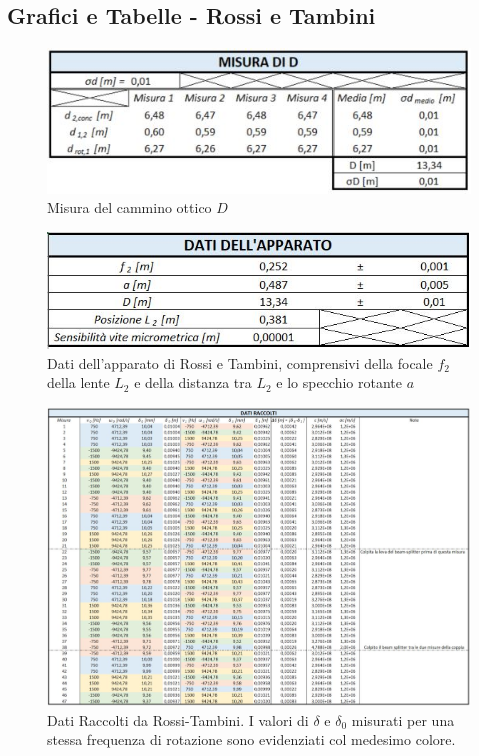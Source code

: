 \documentclass{article}
\begin{document}
\subsection{Grafici e Tabelle - Rossi e Tambini} \label{RT}

\begin{figure}[h]
    \centering
    \includegraphics[width=0.5\linewidth]{RT_D.JPG}
    \caption{Misura del cammino ottico $D$}
    \label{RT_D}
\end{figure}

\begin{figure}[h]
    \centering
    \includegraphics[width=0.6\linewidth]{RT_Apparato.JPG}
    \caption{Dati dell'apparato di Rossi e Tambini, comprensivi della focale $f_2$ della lente $L_2$ e della distanza tra $L_2$ e lo specchio rotante $a$}
    \label{RT_Apparato}
\end{figure}

\begin{figure}[h!]
    \centering
    \includegraphics[width=1.02\linewidth]{RT_DatiRaccolti.JPG}
    \caption{Dati Raccolti da Rossi-Tambini. I valori di $\delta$ e $\delta_0$ misurati per una stessa frequenza di rotazione sono evidenziati col medesimo colore.}
    \label{RT_DatiRaccolti}
\end{figure}
\end{document}
